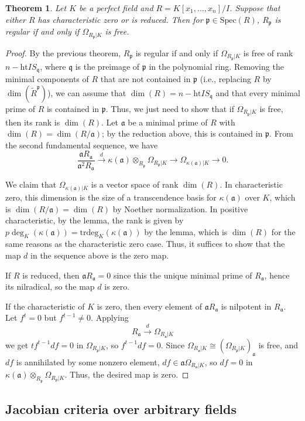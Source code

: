 \documentclass{amsart}[12pt]
\newcommand{\htt}{\mathrm{ht}}
\newcommand{\Spec}{\mathrm{Spec}}
\newcommand{\fp}{{\mathfrak p}}
\newcommand{\fa}{{\mathfrak a}}
\newcommand{\fq}{{\mathfrak q}}
\numberwithin{equation}{section}
\theoremstyle{plain} %
\newtheorem{thm}[equation]{Theorem}
\theoremstyle{definition}
\theoremstyle{remark}
\newcommand{\xra}[1]{\xrightarrow{#1}}
\begin{document}
\begin{thm} Let $K$ be a perfect field and $R=K[x_1,\dots,x_n]/I$. Suppose that either $R$ has characteristic zero or is reduced. Then for $\fp\in \Spec(R)$, $R_{\fp}$ is regular if and only if $\Omega_{R_{\fp}|K}$ is free.
\end{thm}
\begin{proof} By the previous theorem, $R_{\fp}$ is regular if and only if $\Omega_{R_{\fp}|K}$ is free of rank $n-\htt I S_\fq$, where $\fq$ is the preimage of $\fp$ in the polynomial ring. Removing the minimal components of $R$ that are not contained in $\fp$ (i.e., replacing $R$ by  $\dim(\widetilde{R}^\fp)$), we can assume that $\dim(R)=n-\htt I S_\fq$ and that every minimal prime of $R$ is contained in $\fp$. Thus, we just need to show that if $\Omega_{R_{\fp}|K}$ is free, then its rank is $\dim(R)$.
Let $\fa$ be a minimal prime of $R$ with $\dim(R) = \dim(R/\fa)$; by the reduction above, this is contained in $\fp$. From the second fundamental sequence, we have
\[ \frac{\fa R_{\fa}}{\fa^2 R_{\fa}} \xra{d} \kappa(\fa) \otimes_{R_\fp} \Omega_{R_\fp|K} \to \Omega_{\kappa(\fa)|K} \to 0.\]

We claim that $\Omega_{\kappa(\fa)|K}$ is a vector space of rank $\dim(R)$.
In characteristic zero, this dimension is the size of a transcendence basis for $\kappa(\fa)$ over $K$, which is $\dim(R/\fa)=\dim(R)$ by Noether normalization. In positive characteristic, by the lemma, the rank is given by $p\deg_K(\kappa(\fa))=\mathrm{trdeg}_K(\kappa(\fa))$ by the lemma, which is $\dim(R)$ for the same reasons as the characteristic zero case. Thus, it suffices to show that the map $d$ in the sequence above is the zero map.

If $R$ is reduced, then $\fa R_\fa =0$ since this the unique minimal prime of $R_\fa$, hence its nilradical, so the map $d$ is zero.

If the characteristic of $K$ is zero, then every element of $\fa R_\fa$ is nilpotent in $R_\fa$. Let $f^t=0$ but $f^{t-1}\neq 0$. Applying 
\[ R_{\fa} \xra{d} \Omega_{R_{\fa} | K}\]
we get $t f^{t-1} df =0$ in $\Omega_{R_{\fp}|K}$, so $f^{t-1} df =0$. Since $\Omega_{R_\fa|K} \cong (\Omega_{R_\fp|K})_{\fa}$ is free, and $df$ is annihilated by some nonzero element, $df \in \fa \Omega_{R_{\fa} | K}$, so $df=0$ in $\kappa(\fa) \otimes_{R_{\fp}} \Omega_{R_{\fp}|K}$. Thus, the desired map is zero.
\end{proof}


\subsection{Jacobian criteria over arbitrary fields}
\end{document}
